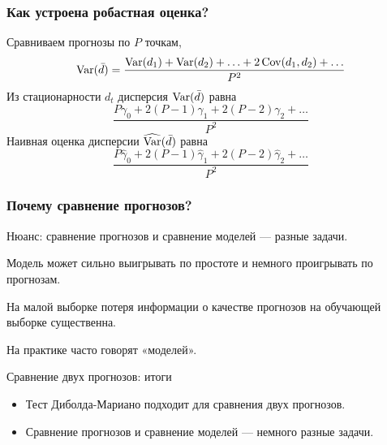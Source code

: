 \begin{frame}
  \frametitle{Как устроена робастная оценка?}
  
  Сравниваем прогнозы по $P$ точкам, 
  \[
  \operatorname{Var}(\bar d) = \frac{\operatorname{Var}(d_1) + \operatorname{Var}(d_2) + \ldots + 2\operatorname{Cov}(d_1, d_2) + \ldots}{P^2}
  \]\pause
  Из стационарности $d_t$ дисперсия $\operatorname{Var}(\bar d)$ равна
  \[
    \frac{P\gamma_0 + 2(P-1) \gamma_1 + 2(P-2)\gamma_2 +\ldots}{P^2} 
  \]\pause 
  Наивная оценка дисперсии $\widehat{\operatorname{Var}}(\bar d)$ равна
  \[
    \frac{ P\hat\gamma_0 + 2(P-1) \hat\gamma_1 + 2(P-2)\hat\gamma_2 +\ldots}{P^2}
  \]
\end{frame}



\begin{frame}
    \frametitle{Почему сравнение прогнозов?}

    \alert{Нюанс}: сравнение прогнозов и сравнение моделей — разные задачи. 
    \pause

    Модель может сильно выигрывать \alert{по простоте} и немного проигрывать по прогнозам.
    \pause 

    На малой выборке \alert{потеря информации} о качестве прогнозов на обучающей выборке существенна. 
    \pause 

    На практике часто \alert{говорят «моделей»}.
\end{frame}


\begin{frame}{Сравнение двух прогнозов: итоги}

  \begin{itemize}[<+->]
    \item Тест Диболда-Мариано подходит для сравнения \alert{двух} прогнозов. 
    \item Сравнение прогнозов и сравнение моделей — \alert{немного разные} задачи.  
  \end{itemize}
\end{frame}

